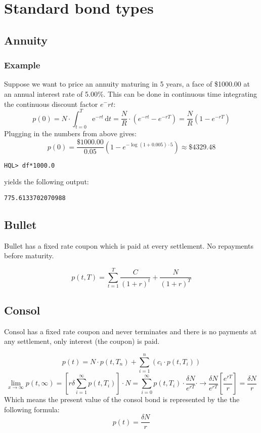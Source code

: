 \documentclass[11pt,a4paper]{article}
\numberwithin{equation}{section}
\begin{document}
\section{Standard bond types}
\subsection{Annuity}

\subsubsection{Example}
Suppose we want to price an annuity maturing in 5 years, a face of \$1000.00 at an annual interest rate of 5.00\%.
This can be done in continuous time integrating the continuous discount factor $e^-rt$:
\[
p(0)=N\cdot \int_{t=0}^T \mathrm{e}^{-rt}\,\mathrm{d}t=\frac{N}{R}\cdot (e^{-rt}-e^{-rT})=\frac{N}{R}(1-e^{-rT})
\]
Plugging in the numbers from above gives:
\[
p(0)=\frac{\$1000.00}{0.05}(1-e^{-\log(1+0.005)\cdot 5})\approx \$4329.48
\]
\begin{lstlisting}
HQL> df*1000.0
\end{lstlisting}
yields the following output:
\FrameSep
\begin{lstlisting}[style=Output]
775.6133702070988
\end{lstlisting}

\subsection{Bullet}
Bullet has a fixed rate coupon which is paid at every settlement. No repayments before maturity.

\[ p(t,T) = \sum_{t=1}^{T}\frac{C}{(1+r)^t} + \frac{N}{(1+r)^T} \]

\subsection{Consol}
Consol has a fixed rate coupon and never terminates and there is no payments at any settlement,
only interest (the coupon) is paid.

\[
p(t) = N \cdot p(t,T_n)+\sum_{i=1}^{n} (c_i \cdot p(t,T_i))
\]
\[
\lim_{x \to \infty} p(t,\infty)=\left[r\delta\sum_{i=1}^{\infty} p(t,T_i)\right]\cdot N = 
\sum_{i=0}^{\infty} p(t,T_i) \cdot \frac{\delta N}{e^{rT}} \cdot \to \frac{\delta N}{e^{rT}}\left[ \frac{e^{rT}}{r}\right] = \frac{\delta N}{r}
\]
Which means the present value of the consol bond is represented by the the following formula:
\[
p(t) = \frac{\delta N}{r}
\]
\end{document}
